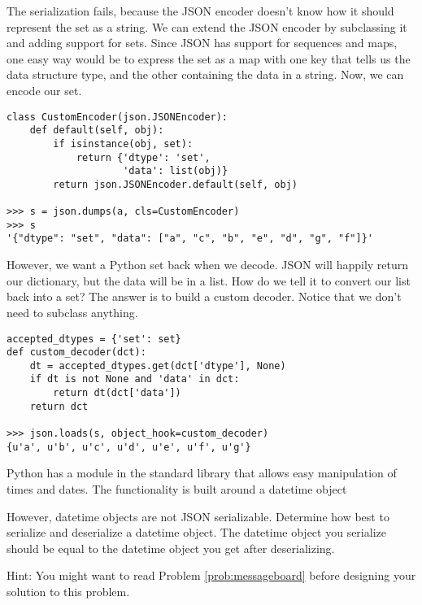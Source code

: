 The serialization fails, because the JSON encoder doesn't know how it should represent the set as a string.
We can extend the JSON encoder by subclassing it and adding support for sets.
Since JSON has support for sequences and maps, one easy way would be to express the set as a map with one key that tells us the data structure type, and the other containing the data in a string.
Now, we can encode our set.
\begin{lstlisting}
class CustomEncoder(json.JSONEncoder):
    def default(self, obj):
        if isinstance(obj, set):
            return {'dtype': 'set',
                    'data': list(obj)}
        return json.JSONEncoder.default(self, obj)
        
>>> s = json.dumps(a, cls=CustomEncoder)
>>> s
'{"dtype": "set", "data": ["a", "c", "b", "e", "d", "g", "f"]}'
\end{lstlisting}
However, we want a Python set back when we decode.
JSON will happily return our dictionary, but the data will be in a list.
How do we tell it to convert our list back into a set?
The answer is to build a custom decoder.
Notice that we don't need to subclass anything.
\begin{lstlisting}
accepted_dtypes = {'set': set}
def custom_decoder(dct):
    dt = accepted_dtypes.get(dct['dtype'], None)
    if dt is not None and 'data' in dct:
        return dt(dct['data'])
    return dct

>>> json.loads(s, object_hook=custom_decoder)
{u'a', u'b', u'c', u'd', u'e', u'f', u'g'}
\end{lstlisting}

\begin{problem}
Python has a module in the standard library that allows easy manipulation of times and dates.  The functionality is built around a datetime object

However, datetime objects are not JSON serializable.
Determine how best to serialize and deserialize a datetime object.
The datetime object you serialize should be equal to the datetime object you get after deserializing.

Hint: You might want to read Problem \ref{prob:messageboard} before designing your solution to this problem.
\label{prob:datetime_json}
\end{problem}


